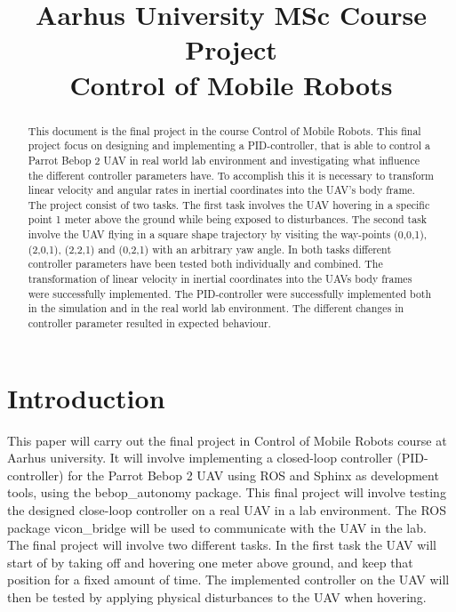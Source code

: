 \documentclass[conference]{IEEEtran}
\begin{document}
\title{Aarhus University MSc Course Project  \\ Control of Mobile Robots}

\author{
}

\maketitle

\begin{abstract}

This document is the final project in the course Control of Mobile Robots. This final project focus on designing and implementing a PID-controller, that is able to control a Parrot Bebop 2 UAV in real world lab environment and investigating what influence the different controller parameters have. To accomplish this it is necessary to transform linear velocity and angular rates in inertial coordinates into the UAV's body frame. The project consist of two tasks. The first task involves the UAV hovering in a specific point 1 meter above the ground while being exposed to disturbances. The second task involve the UAV flying in a square shape trajectory by visiting the way-points (0,0,1), (2,0,1), (2,2,1) and (0,2,1) with an arbitrary yaw angle. 
In both tasks different controller parameters have been tested both individually and combined. The transformation of linear velocity in inertial coordinates into the UAVs body frames were successfully implemented. The PID-controller were successfully implemented both in the simulation and in the real world lab environment. The different changes in controller parameter resulted in expected behaviour. 

\end{abstract}

\section{Introduction}

This paper will carry out the final project in Control of Mobile Robots course at Aarhus university. It will involve implementing a closed-loop controller (PID-controller) for the Parrot Bebop 2 UAV using ROS and Sphinx as development tools, using the bebop\_autonomy package. This final project will involve testing the designed close-loop controller on a real UAV in a lab environment. The ROS package vicon\_bridge will be used to communicate with the UAV in the lab. \\
The final project will involve two different tasks. In the first task the UAV will start of by taking off and hovering one meter above ground, and keep that position for a fixed amount of time. The implemented controller on the UAV will then be tested by applying physical disturbances to the UAV when hovering. 
\end{document}
